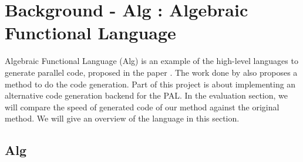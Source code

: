 \chapter{Background - Alg : Algebraic Functional Language}
Algebraic Functional Language (Alg) is an example of the high-level languages to generate parallel code, proposed in the paper \cite{AlgebraicMultipartyProtocol}. The work done by \cite{AlgebraicMultipartyProtocol} also proposes a method to do the code generation. Part of this project is about implementing an alternative code generation backend for the PAL. In the evaluation section, we will compare the speed of generated code of our method against the original method. We will give an overview of the language in this section.  
\section{Alg}
